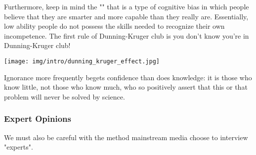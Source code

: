 	Furthermore, keep in mind the "\label{Dunning-Kruger effect}" that is a type of cognitive bias in which people believe that they are smarter and more capable than they really are. Essentially, low ability people do not possess the skills needed to recognize their own incompetence. The first rule of Dunning-Kruger club is you don't know you're in Dunning-Kruger club!
	\begin{center}
		\texttt{[image: img/intro/dunning\_kruger\_effect.jpg]}
	\end{center}
	\begin{fquote}Ignorance more frequently begets confidence than does knowledge: it is those who know little, not those who know much, who so positively assert that this or that problem will never be solved by science.
 	\end{fquote}
	
	\pagebreak
	\subsubsection{Expert Opinions}
	We must also be careful with the method mainstream media choose to interview "experts". 
	
